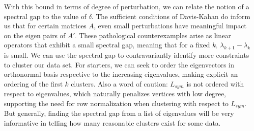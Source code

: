 \documentclass[letterpaper,12pt]{article}
\begin{document}
\noindent
With this bound in terms of degree of perturbation, we can relate the notion of a spectral gap to the value of $\delta$. The sufficient conditions of Davis-Kahan do inform us that for certain matrices $A$, even small perturbations have meaningful impact on the eigen pairs of $A'$. These pathological counterexamples arise as linear operators that exhibit a small spectral gap, meaning that for a fixed $k$, $\lambda_{k+1} - \lambda_{k}$ is small.  We can use the spectral gap to contravariantly identify more constraints to cluster our data set. For starters, we can seek to order the eigenvectors in orthonormal basis respective to the increasing eigenvalues, making explicit an ordering of the first $k$ clusters. Also a word of caution: $L_{sym}$ is not ordered with respect to eigenvalues, which naturally penalizes vertices with low degree, supporting the need for row normalization when clustering with respect to $L_{sym}$. But generally, finding the spectral gap from a list of eigenvalues will be very informative in telling how many reasonable clusters exist for some data.
\end{document}
